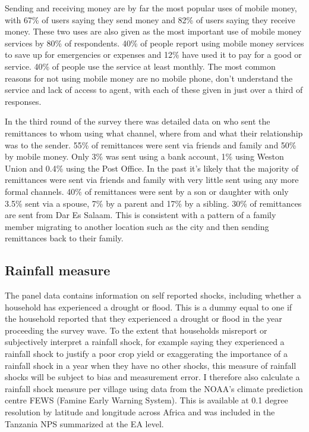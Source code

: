Sending and receiving money are by far the most popular uses of mobile money, with 67\% of users saying they send money and 82\% of users saying they receive money. These two uses are also given as the most important use of mobile money services by 80\% of respondents. 40\% of people report using mobile money services to save up for emergencies or expenses and 12\% have used it to pay for a good or service. 40\% of people use the service at least monthly. The most common reasons for not using mobile money are no mobile phone, don't understand the service and lack of access to agent, with each of these given in just over a third of responses.  

In the third round of the survey there was detailed data on who sent the remittances to whom using what channel, where from and what their relationship was to the sender. 55\% of remittances were sent via friends and family and 50\% by mobile money. Only 3\% was sent using a bank account, 1\% using Weston Union and 0.4\% using the Post Office. In the past it's likely that the majority of remittances were sent via friends and family with very little sent using any more formal channels. 40\% of remittances were sent by a son or daughter with only 3.5\% sent via a spouse, 7\% by a parent and 17\% by a sibling. 30\% of remittances are sent from Dar Es Salaam. This is consistent with a pattern of a family member migrating to another location such as the city and then sending remittances back to their family. 


\subsection{Rainfall measure}
The panel data contains information on self reported shocks, including whether a household has experienced a drought or flood. This is a dummy equal to one if the household reported that they experienced a drought or flood in the year proceeding the survey wave. To the extent that households misreport or subjectively interpret a rainfall shock, for example saying they experienced a rainfall shock to justify a poor crop yield or exaggerating the importance of a rainfall shock in a year when they have no other shocks, this measure of rainfall shocks will be subject to bias and measurement error. I therefore also calculate a rainfall shock measure per village using data from the NOAA's climate prediction centre FEWS (Famine Early Warning System). This is available at 0.1 degree resolution by latitude and longitude across Africa and was included in the Tanzania NPS summarized at the EA level. 

